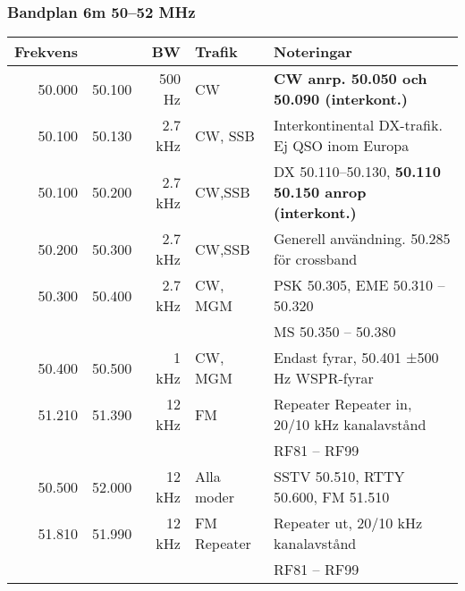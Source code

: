 \subsubsection{Bandplan 6m 50--52 MHz}
\begin{tabular}{rrrll}

\textbf{Frekvens} &  & \textbf{BW} & \textbf{Trafik} & \textbf{Noteringar} \\ \hline

50.000 & 50.100 & 500 Hz  & CW          & \textbf{CW anrp. 50.050 och 50.090 (interkont.)}             \\ \hline
50.100 & 50.130 & 2.7 kHz & CW, SSB     & Interkontinental DX-trafik. Ej QSO inom Europa               \\ \hline
50.100 & 50.200 & 2.7 kHz & CW,SSB      & DX 50.110--50.130, \textbf{50.110 50.150 anrop (interkont.)} \\ \hline
50.200 & 50.300 & 2.7 kHz & CW,SSB      & Generell användning. 50.285 för crossband                    \\ \hline
50.300 & 50.400 & 2.7 kHz & CW, MGM     & PSK 50.305, EME 50.310 – 50.320                              \\
       &        &         &             & MS 50.350 – 50.380                                           \\ \hline
50.400 & 50.500 & 1 kHz   & CW, MGM     & Endast fyrar, 50.401 ±500 Hz WSPR-fyrar                      \\ \hline
51.210 & 51.390 & 12 kHz  & FM          & Repeater Repeater in, 20/10 kHz kanalavstånd                 \\
       &        &         &             & RF81 – RF99                                                  \\ \hline
50.500 & 52.000 & 12 kHz  & Alla moder  & SSTV 50.510, RTTY 50.600, FM 51.510                          \\ \hline
51.810 & 51.990 & 12 kHz  & FM Repeater & Repeater ut, 20/10 kHz kanalavstånd                          \\
       &        &         &             & RF81 – RF99                                                  \\ \hline
\end{tabular}

